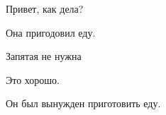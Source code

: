 \documentclass{article}
\begin{document}
Привет, как дела?

Она пригодовил еду.

Запятая не нужна

Это хорошо.

Он был вынужден приготовить еду.
\end{document}
